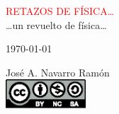 %
%

\newcommand*{\titleTH}{\begingroup%
\raggedleft
\vspace*{\baselineskip}
{\textcolor{red}{\Huge RETAZOS DE FÍSICA\dots}}\\[\baselineskip]
{\large\dots un revuelto de física\dots}\par
\vspace{4ex}
{\large\today}\par
\vspace{10ex}
{\large José A. Navarro Ramón}\\[0.167\textheight]
\vspace{20ex}
{\Large \includegraphics[width=3.0cm]{./img/static/Cc-by-nc-sa_icon.eps}}\par
\vspace*{3\baselineskip}
\endgroup}

\titleTH





